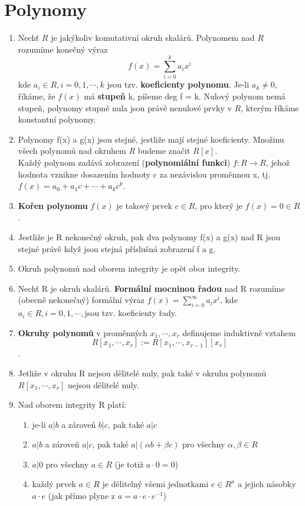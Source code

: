 \documentclass[12pt,a4paper]{article}
\begin{document}
\section{Polynomy}
	\begin{enumerate}
      \item Nechť $R$ je jakýkoliv komutativní okruh skalárů. Polynomem nad $R$ rozumíme konečný výraz
      \[f(x)=\sum_{i=0}^{k}a_ix^i\] kde $a_i \in R, i=0,1,\cdots,k$ jsou tzv. \textbf{koeficienty polynomu}. Je-li $a_k\neq0$, říkáme, že $f(x)$ má \textbf{stupeň} k, píšeme deg f = k. Nulový polynom nemá stupeň, polynomy stupně nula jsou právě nenulové prvky v $R$, kterým říkáme konstantní polynomy.

      \item Polynomy f(x) a g(x) jsou stejné, jestliže mají stejné koeficienty. Množinu všech polynomů nad okruhem $R$ budeme značit $R[x]$.\\Každý polynom zadává zobrazení (\textbf{polynomiální funkci}) $f:R\rightarrow R$, jehož hodnota vznikne dosazením hodnoty c za nezávislou proměnnou x, tj. $f(x)=a_0+a_1c+\cdots+a_kc^k$.

      \item \textbf{Kořen polynomu} $f(x)$ je takový prvek $c\in R$, pro který je $f(x) = 0\in R$.

      \item Jestliže je R nekonečný okruh, pak dva polynomy f(x) a g(x) nad R jsou stejné právě když jsou stejná příslušná zobrazení f a g.

      \item Okruh polynomů nad oborem integrity je opět obor integrity.
      

      \item Nechť R je okruh skalárů. \textbf{Formální mocninou řadou} nad R rozumíme (obecně nekonečný) formální výraz $f(x) = \sum_{i=0}^{\infty}a_ix^i$, kde $a_i \in R, i=0,1,\cdots,$jsou tzv. koeficienty řady.

      
      \item \textbf{Okruhy polynomů} v proměnných $x_1,\cdots,x_r$ definujeme induktivně vztahem 
      \[R[x_1,\cdots,x_r]:=R[x_1,\cdots,x_{r-1}][x_r]\]. 
      
      \item Jetliže v okruhu R nejsou dělitelé nuly, pak také v okruhu polynomů $R[x_1,\cdots,x_r]$ nejsou dělitelé nuly.
      
      \item Nad oborem integrity R platí:
      \begin{enumerate}
      	\item je-li $a|b$ a zároveň $b|c$, pak také $a|c$
      	\item $a|b$ a zároveň $a|c$, pak také $a|(\alpha b +\beta c)$ pro všechny $\alpha,\beta \in R$
      	\item $a|0$ pro všechny $a\in R$ (je totiž $a\cdot0=0$)
      	\item každý prvek $a \in R$ je dělitelný všemi jednotkami $e\in R^x$ a jejich násobky $a\cdot e$ (jak přímo plyne z $a=a\cdot e\cdot e^{-1}$)
      \end{enumerate}
      

\end{enumerate}
\end{document}
